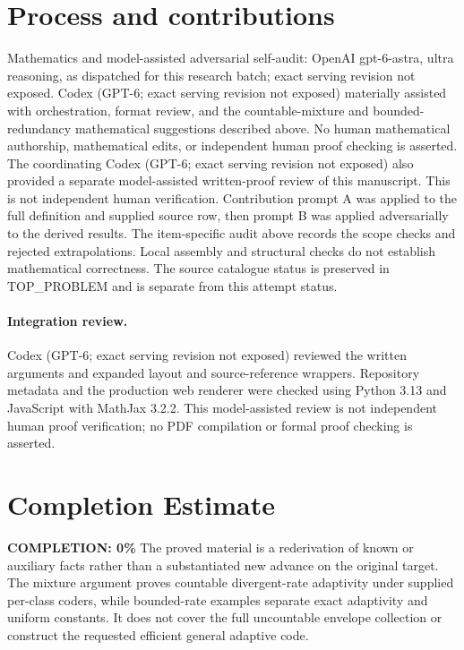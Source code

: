 \documentclass[11pt]{article}
\begin{document}
\section{Process and contributions}
Mathematics and model-assisted adversarial self-audit: OpenAI gpt-6-astra, ultra reasoning, as dispatched for this research batch; exact serving revision not exposed. Codex (GPT-6; exact serving revision not exposed) materially assisted with orchestration, format review, and the countable-mixture and bounded-redundancy mathematical suggestions described above. No human mathematical authorship, mathematical edits, or independent human proof checking is asserted.
The coordinating Codex (GPT-6; exact serving revision not exposed) also provided a separate model-assisted written-proof review of this manuscript. This is not independent human verification.
Contribution prompt A was applied to the full definition and supplied source row, then prompt B was applied adversarially to the derived results. The item-specific audit above records the scope checks and rejected extrapolations. Local assembly and structural checks do not establish mathematical correctness. The source catalogue status is preserved in TOP\_PROBLEM and is separate from this attempt status.
\paragraph{Integration review.} Codex (GPT-6; exact serving revision not exposed) reviewed the written arguments and expanded layout and source-reference wrappers. Repository metadata and the production web renderer were checked using Python 3.13 and JavaScript with MathJax 3.2.2. This model-assisted review is not independent human proof verification; no PDF compilation or formal proof checking is asserted.

\section{Completion Estimate}
\noindent\textbf{COMPLETION: 0\%}
The proved material is a rederivation of known or auxiliary facts rather than a substantiated new advance on the original target. The mixture argument proves countable divergent-rate adaptivity under supplied per-class coders, while bounded-rate examples separate exact adaptivity and uniform constants. It does not cover the full uncountable envelope collection or construct the requested efficient general adaptive code.
\end{document}
